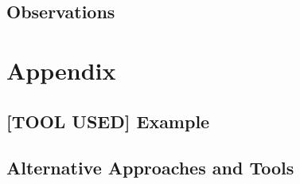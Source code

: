 \documentclass[12pt, letterpaper]{article}
\begin{document}
\paragraph{\blindtext}
\paragraph{\blindtext}
\paragraph{\blindtext}
\paragraph{\blindtext}

\subsection{Observations}
\paragraph{\blindtext}
\paragraph{\blindtext}

\section{Appendix}

\subsection{[TOOL USED] Example}
\paragraph{\blindtext}
\paragraph{\blindtext}
\paragraph{\blindtext}

\subsection{Alternative Approaches and Tools}
\paragraph{\blindtext}

\end{document}
